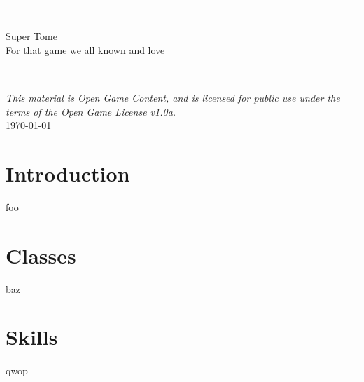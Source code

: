 \documentclass[12pt,twoside,onecolumn,openany,final]{memoir}
\begin{document}
\thispagestyle{empty}
\begin{center}
\textsc{\Large}\\[0.25cm]
\rule{\linewidth}{0.5mm} \\[0.70cm]
\fontsize{30}{30} \selectfont Super Tome\\[.30cm]
\fontsize{16}{18} \selectfont \guillemotleft{} For that game we all known and love \guillemotright{}\\
\rule{\linewidth}{0.5mm} \\[0.6cm]
\vfill
\footnotesize{\textit{This material is Open Game Content, and is licensed for public use under the terms of the Open Game License v1.0a.}}\\
\normalsize{\today}
\end{center}

\pagebreak
\sffamily
\pagestyle{plain}
\raggedbottom

\renewcommand{\contentsname}{Table of Contents}
\setcounter{tocdepth}{1}
\tableofcontents



\clearpage
\chapter{Introduction}
foo



\chapter{Classes}
baz
\chapter{Skills}
qwop
\end{document}
